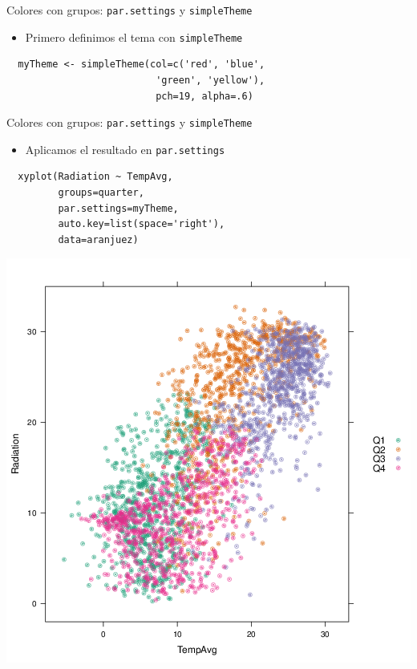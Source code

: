 \documentclass[xcolor={usenames,svgnames,dvipsnames}]{beamer}
\begin{document}
\begin{frame}[fragile,label={sec:orgheadline29}]{Colores con grupos: \texttt{par.settings} y \texttt{simpleTheme}}
 \begin{itemize}
\item Primero definimos el tema con \texttt{simpleTheme}
\end{itemize}
\lstset{language=R,label= ,caption= ,captionpos=b,numbers=none}
\begin{lstlisting}
  myTheme <- simpleTheme(col=c('red', 'blue',
                          'green', 'yellow'),
                          pch=19, alpha=.6)
\end{lstlisting}
\end{frame}

\begin{frame}[fragile,label={sec:orgheadline30}]{Colores con grupos: \texttt{par.settings} y \texttt{simpleTheme}}
 \begin{itemize}
\item Aplicamos el resultado en \texttt{par.settings}
\end{itemize}
\lstset{language=R,label= ,caption= ,captionpos=b,numbers=none}
\begin{lstlisting}
  xyplot(Radiation ~ TempAvg,
         groups=quarter,
         par.settings=myTheme,
         auto.key=list(space='right'),
         data=aranjuez)
\end{lstlisting}
\end{frame}

\begin{frame}[label={sec:orgheadline31}]{}
\includegraphics[width=.9\linewidth]{figs/myTheme.png}
\end{frame}
\end{document}

